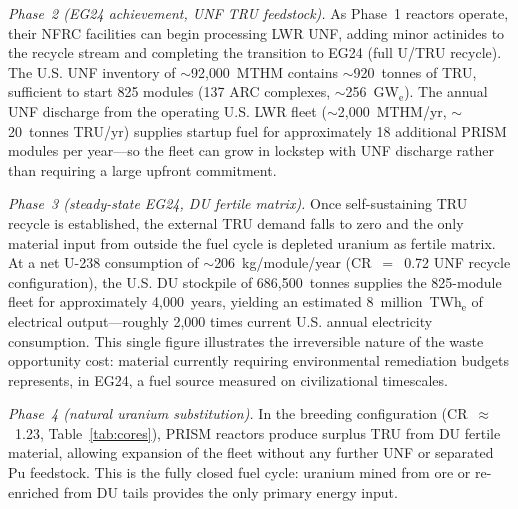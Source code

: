 \documentclass[10pt,twoside]{article}
\begin{document}
\textit{Phase~2 (EG24 achievement, UNF TRU feedstock).}
As Phase~1 reactors operate, their NFRC facilities can begin processing
LWR UNF, adding minor actinides to the recycle stream and completing
the transition to EG24 (full U/TRU recycle).  The U.S. UNF inventory
of $\sim$92{,}000~MTHM contains $\sim$920~tonnes of TRU, sufficient
to start 825 modules (137 ARC complexes, $\sim$256~GW$_\text{e}$).
The annual UNF discharge from the operating U.S. LWR fleet
($\sim$2{,}000~MTHM/yr, $\sim$20~tonnes TRU/yr) supplies startup
fuel for approximately 18 additional PRISM modules per year---so
the fleet can grow in lockstep with UNF discharge rather than requiring
a large upfront commitment.

\textit{Phase~3 (steady-state EG24, DU fertile matrix).}
Once self-sustaining TRU recycle is established, the external TRU demand
falls to zero and the only material input from outside the fuel cycle
is depleted uranium as fertile matrix.  At a net U-238 consumption of
$\sim$206~kg/module/year (CR~$=$~0.72 UNF recycle configuration), the
U.S. DU stockpile of 686{,}500~tonnes supplies the 825-module fleet
for approximately 4{,}000~years, yielding an estimated 8~million~TWh$_\text{e}$
of electrical output---roughly 2{,}000 times current U.S. annual electricity
consumption.  This single figure illustrates the irreversible nature of
the waste opportunity cost: material currently requiring environmental
remediation budgets represents, in EG24, a fuel source measured on
civilizational timescales.

\textit{Phase~4 (natural uranium substitution).}
In the breeding configuration (CR~$\approx$~1.23, Table~\ref{tab:cores}),
PRISM reactors produce surplus TRU from DU fertile material, allowing
expansion of the fleet without any further UNF or separated Pu feedstock.
This is the fully closed fuel cycle: uranium mined from ore or re-enriched
from DU tails provides the only primary energy input.
\end{document}
